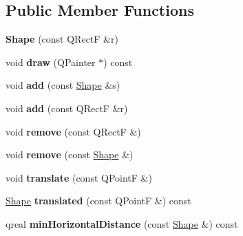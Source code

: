 \subsection*{Public Member Functions}
\begin{DoxyCompactItemize}
\item 
\mbox{\label{class_ms_1_1_shape_a0e2344bbbadbc13a98767ee1c93b4aa3}} 
{\bfseries Shape} (const Q\+RectF \&r)
\item 
\mbox{\label{class_ms_1_1_shape_ae720dd8861c1ee7e1c1267a1467d6620}} 
void {\bfseries draw} (Q\+Painter $\ast$) const
\item 
\mbox{\label{class_ms_1_1_shape_aaf147d607f2bf5e6fc8a6ed1cb019ef7}} 
void {\bfseries add} (const \hyperlink{class_ms_1_1_shape}{Shape} \&s)
\item 
\mbox{\label{class_ms_1_1_shape_a780f5e137881c72c344a657d740e468d}} 
void {\bfseries add} (const Q\+RectF \&r)
\item 
\mbox{\label{class_ms_1_1_shape_aec371e074141d165e014fa671a34bec8}} 
void {\bfseries remove} (const Q\+RectF \&)
\item 
\mbox{\label{class_ms_1_1_shape_ab56e92489024c20457b7963295895dcc}} 
void {\bfseries remove} (const \hyperlink{class_ms_1_1_shape}{Shape} \&)
\item 
\mbox{\label{class_ms_1_1_shape_a68602b449079621b10afecdaea3cbe60}} 
void {\bfseries translate} (const Q\+PointF \&)
\item 
\mbox{\label{class_ms_1_1_shape_a51535d0e5b819152b44f47f98925e1e7}} 
\hyperlink{class_ms_1_1_shape}{Shape} {\bfseries translated} (const Q\+PointF \&) const
\item 
\mbox{\label{class_ms_1_1_shape_a159413b243aff63b765b2a0aebde7f36}} 
qreal {\bfseries min\+Horizontal\+Distance} (const \hyperlink{class_ms_1_1_shape}{Shape} \&) const
\item 
\mbox{\label{class_ms_1_1_shape_a317e21df057a3f52374e2ae9c487c361}} 

\end{DoxyCompactItemize}
